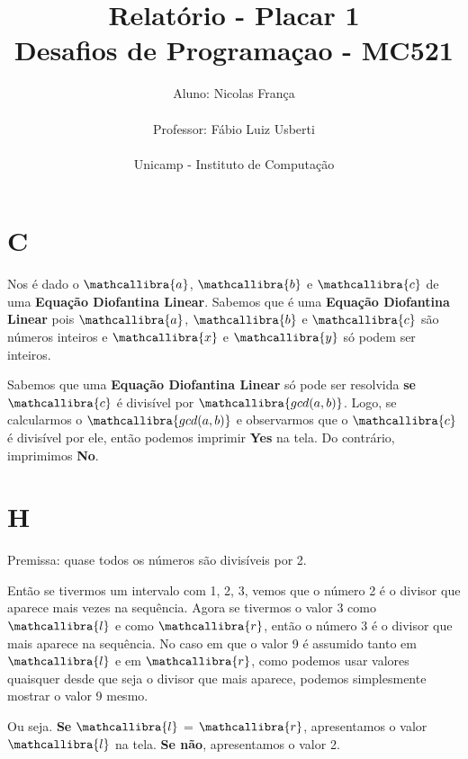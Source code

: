 \documentclass[a4paper,11pt,fleqn]{article}
\title{Relatório - Placar 1\\
Desafios de Programaçao - MC521}
\author{Aluno: Nicolas França\\\\
Professor: Fábio Luiz Usberti\\\\
Unicamp - Instituto de Computação\\}
\date{}
\begin{document}
\maketitle

\section{C}
\label{s:c}

Nos é dado o $\mathcallibra{a}$, $\mathcallibra{b}$ e $\mathcallibra{c}$ de uma 
  \textbf{Equação Diofantina Linear}. Sabemos que é uma \textbf{Equação Diofantina Linear} pois $\mathcallibra{a}$, $\mathcallibra{b}$ e 
  $\mathcallibra{c}$ são números inteiros e $\mathcallibra{x}$ e $\mathcallibra{y}$ só
  podem ser inteiros.

Sabemos que uma \textbf{Equação Diofantina Linear} só pode ser resolvida \textbf{se}
  $\mathcallibra{c}$ é divisível por $\mathcallibra{gcd(a, b)}$. Logo, se calcularmos
  o $\mathcallibra{gcd(a, b)}$ e observarmos que o $\mathcallibra{c}$ é divisível por ele,
  então podemos imprimir \textbf{Yes} na tela. Do contrário, imprimimos \textbf{No}.


\section{H}
\label{s:h}

Premissa: quase todos os números são divisíveis por 2.

Então se tivermos um intervalo com 1, 2, 3, vemos que o número 2 é o divisor que aparece mais
  vezes na sequência. Agora se tivermos o valor 3 como $\mathcallibra{l}$ e como $\mathcallibra{r}$,
  então o número 3 é o divisor que mais aparece na sequência.
  No caso em que o valor 9 é assumido tanto em $\mathcallibra{l}$ e em $\mathcallibra{r}$, como podemos
  usar valores quaisquer desde que seja o divisor que mais aparece, podemos simplesmente mostrar o 
  valor 9 mesmo.

Ou seja. \textbf{Se} $\mathcallibra{l}$ = $\mathcallibra{r}$, apresentamos o valor $\mathcallibra{l}$ na tela. \textbf{Se não}, apresentamos
  o valor 2.





\end{document}
